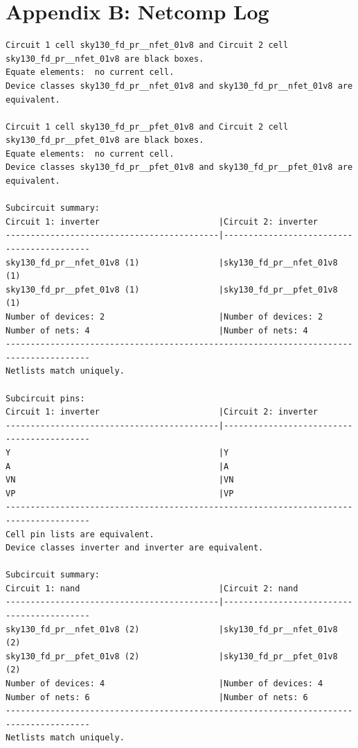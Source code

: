 \documentclass[11pt]{article}
\begin{document}
\section*{Appendix B: Netcomp Log}
\begin{lstlisting}
Circuit 1 cell sky130_fd_pr__nfet_01v8 and Circuit 2 cell sky130_fd_pr__nfet_01v8 are black boxes.
Equate elements:  no current cell.
Device classes sky130_fd_pr__nfet_01v8 and sky130_fd_pr__nfet_01v8 are equivalent.

Circuit 1 cell sky130_fd_pr__pfet_01v8 and Circuit 2 cell sky130_fd_pr__pfet_01v8 are black boxes.
Equate elements:  no current cell.
Device classes sky130_fd_pr__pfet_01v8 and sky130_fd_pr__pfet_01v8 are equivalent.

Subcircuit summary:
Circuit 1: inverter                        |Circuit 2: inverter                        
-------------------------------------------|-------------------------------------------
sky130_fd_pr__nfet_01v8 (1)                |sky130_fd_pr__nfet_01v8 (1)                
sky130_fd_pr__pfet_01v8 (1)                |sky130_fd_pr__pfet_01v8 (1)                
Number of devices: 2                       |Number of devices: 2                       
Number of nets: 4                          |Number of nets: 4                          
---------------------------------------------------------------------------------------
Netlists match uniquely.

Subcircuit pins:
Circuit 1: inverter                        |Circuit 2: inverter                        
-------------------------------------------|-------------------------------------------
Y                                          |Y                                          
A                                          |A                                          
VN                                         |VN                                         
VP                                         |VP                                         
---------------------------------------------------------------------------------------
Cell pin lists are equivalent.
Device classes inverter and inverter are equivalent.

Subcircuit summary:
Circuit 1: nand                            |Circuit 2: nand                            
-------------------------------------------|-------------------------------------------
sky130_fd_pr__nfet_01v8 (2)                |sky130_fd_pr__nfet_01v8 (2)                
sky130_fd_pr__pfet_01v8 (2)                |sky130_fd_pr__pfet_01v8 (2)                
Number of devices: 4                       |Number of devices: 4                       
Number of nets: 6                          |Number of nets: 6                          
---------------------------------------------------------------------------------------
Netlists match uniquely.


\end{lstlisting}
\end{document}
